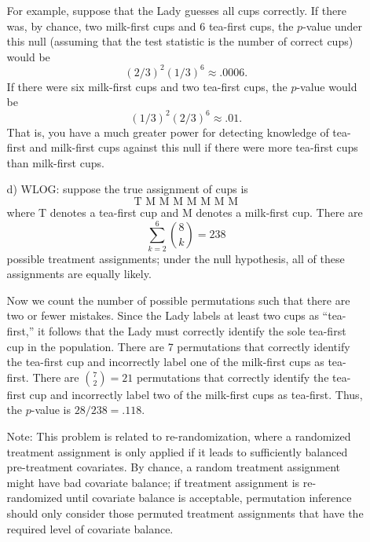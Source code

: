 \documentclass{article}
\begin{document}
\begin{itemize}
\begin{itemize}
    For example, suppose that the Lady guesses all cups correctly.
    If there was, by chance, two milk-first cups and 6 tea-first cups, the $p$-value under
    this null (assuming that the test statistic is the number of correct cups) would be
    $$
      (2/3)^2(1/3)^6 \approx .0006.
    $$
    If there were six milk-first cups and two tea-first cups, the $p$-value would be
    $$
      (1/3)^2(2/3)^6 \approx .01.
    $$
    That is, you have a much greater power for 
    detecting knowledge of tea-first and milk-first cups
    against this null if there were more tea-first cups than milk-first cups.
  \item[d)]  
    WLOG: suppose the true assignment of cups is
    $$ 
      \text{T M M M M M M M}
    $$
    where T denotes a tea-first cup and M denotes a milk-first cup.
    There are
    $$
      \sum_{k=2}^6\binom{8}{ k} = 238
    $$
    possible treatment assignments; under the null hypothesis, all of these
    assignments are equally likely.
    
    Now we count the number of possible permutations such that there are two or fewer
    mistakes.
    Since the Lady labels at least two cups as ``tea-first,''
    it follows that the Lady must correctly identify the sole tea-first cup in the
    population.
    There are 7 permutations that correctly identify the tea-first cup and
    incorrectly label one of the milk-first cups as tea-first.
    There are $\binom{7}{2} = 21$ permutations that correctly identify
    the tea-first cup and incorrectly label two of the milk-first cups as tea-first.
    Thus, the $p$-value is $28/238 = .118$.
    
    Note: This problem is related to re-randomization, where a randomized
    treatment assignment is only applied if it leads to sufficiently balanced 
    pre-treatment covariates.
    By chance, a random treatment assignment might have bad covariate balance;
    if treatment assignment is  re-randomized until covariate balance is acceptable,
    permutation inference should only consider those permuted treatment assignments 
    that have the required level of covariate balance.    
\end{itemize}


\end{itemize}
\end{document}
